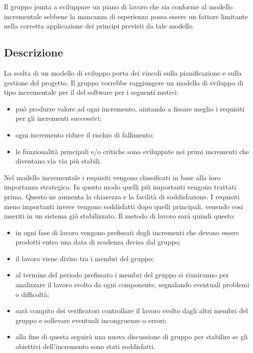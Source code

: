 Il gruppo \Gruppo{} punta a sviluppare un piano di lavoro che sia conforme al modello incrementale sebbene la mancanza di esperienza possa essere un fattore limitante nella corretta applicazione dei principi previsti da tale modello.

\subsection{Descrizione}
La scelta di un modello di sviluppo porta dei vincoli sulla pianificazione e sulla gestione del progetto.
Il gruppo vorrebbe raggiungere un modello di sviluppo di tipo incrementale per il  del software per i seguenti motivi:
\begin{itemize}
    \item può produrre valore ad ogni incremento, aiutando a fissare meglio i requisiti per gli incrementi
    successivi;
    \item ogni incremento riduce il rischio di fallimento;
    \item le funzionalità principali e/o critiche sono sviluppate nei primi incrementi che diventano via via più stabili.
\end{itemize}





Nel modello incrementale i requisiti vengono classificati in base alla loro importanza strategica. In
questo modo quelli più importanti vengono trattati prima. Questo ne aumenta la chiarezza e la
facilità di soddisfazione. I requisiti meno importanti invece vengono soddisfatti dopo quelli principali, venendo cosi inseriti in un sistema già stabilizzato.
Il metodo di lavoro sarà quindi questo:
\begin{itemize}
    \item in ogni fase di lavoro vengono prefissati degli incrementi che devono essere prodotti entro una data di
    scadenza decisa dal gruppo;
    \item il lavoro viene diviso tra i membri del gruppo;
    \item al termine del periodo prefissato i membri del gruppo si riuniranno per analizzare il lavoro svolto da ogni
    componente, segnalando eventuali problemi o difficoltà;
    \item sarà compito dei verificatori controllare il lavoro svolto dagli altri membri del gruppo e sollevare
    eventuali incongruenze o errori;
    \item alla fine di questa  seguirà una nuova discussione di gruppo per stabilire se gli obiettivi
    dell’incremento sono stati soddisfatti.
\end{itemize}






